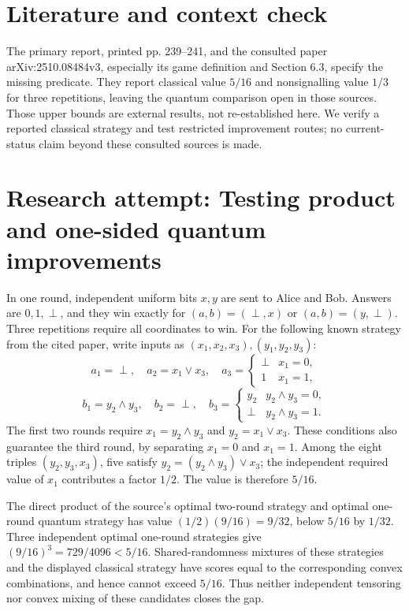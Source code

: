 \documentclass[11pt]{article}
\begin{document}
\section{Literature and context check}
The primary report, printed pp. 239--241, and the consulted paper arXiv:2510.08484v3, especially its game definition and Section 6.3, specify the missing predicate. They report classical value $5/16$ and nonsignalling value $1/3$ for three repetitions, leaving the quantum comparison open in those sources. Those upper bounds are external results, not re-established here. We verify a reported classical strategy and test restricted improvement routes; no current-status claim beyond these consulted sources is made.
\section{Research attempt: Testing product and one-sided quantum improvements}

In one round, independent uniform bits $x,y$ are sent to Alice and Bob. Answers are $0,1,\perp$, and they win exactly for $(a,b)=(\perp,x)$ or $(a,b)=(y,\perp)$. Three repetitions require all coordinates to win. For the following known strategy from the cited paper, write inputs as $(x_1,x_2,x_3),(y_1,y_2,y_3)$:
\[
a_1=\perp,\quad a_2=x_1\vee x_3,\quad
 a_3=\begin{cases}\perp&x_1=0,\\1&x_1=1,\end{cases}
\]
\[
b_1=y_2\wedge y_3,\quad b_2=\perp,\quad
 b_3=\begin{cases}y_2&y_2\wedge y_3=0,\\\perp&y_2\wedge y_3=1.\end{cases}
\]
The first two rounds require $x_1=y_2\wedge y_3$ and $y_2=x_1\vee x_3$. These conditions also guarantee the third round, by separating $x_1=0$ and $x_1=1$. Among the eight triples $(y_2,y_3,x_3)$, five satisfy $y_2=(y_2\wedge y_3)\vee x_3$; the independent required value of $x_1$ contributes a factor $1/2$. The value is therefore $5/16$.

The direct product of the source's optimal two-round strategy and optimal one-round quantum strategy has value $(1/2)(9/16)=9/32$, below $5/16$ by $1/32$. Three independent optimal one-round strategies give $(9/16)^3=729/4096<5/16$. Shared-randomness mixtures of these strategies and the displayed classical strategy have scores equal to the corresponding convex combinations, and hence cannot exceed $5/16$. Thus neither independent tensoring nor convex mixing of these candidates closes the gap.
\end{document}
